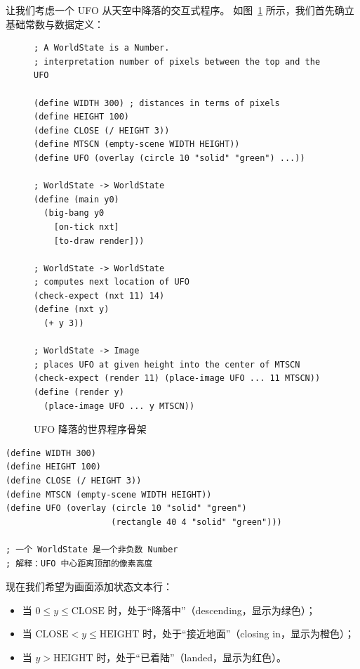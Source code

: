 让我们考虑一个 UFO 从天空中降落的交互式程序。
如图~\ref{fig:ufo_descending} 所示，我们首先确立基础常数与数据定义：

\begin{figure}[htbp]
  \centering
\begin{lstlisting}[language=BSL, basicstyle=\scriptsize\ttfamily]
; A WorldState is a Number.
; interpretation number of pixels between the top and the UFO

(define WIDTH 300) ; distances in terms of pixels
(define HEIGHT 100)
(define CLOSE (/ HEIGHT 3))
(define MTSCN (empty-scene WIDTH HEIGHT))
(define UFO (overlay (circle 10 "solid" "green") ...))

; WorldState -> WorldState
(define (main y0)
  (big-bang y0
    [on-tick nxt]
    [to-draw render]))

; WorldState -> WorldState
; computes next location of UFO
(check-expect (nxt 11) 14)
(define (nxt y)
  (+ y 3))

; WorldState -> Image
; places UFO at given height into the center of MTSCN
(check-expect (render 11) (place-image UFO ... 11 MTSCN))
(define (render y)
  (place-image UFO ... y MTSCN))
\end{lstlisting}
  \caption{UFO 降落的世界程序骨架}
  \label{fig:ufo_descending}
\end{figure}

\begin{lstlisting}[language=BSL]
(define WIDTH 300)
(define HEIGHT 100)
(define CLOSE (/ HEIGHT 3))
(define MTSCN (empty-scene WIDTH HEIGHT))
(define UFO (overlay (circle 10 "solid" "green")
                     (rectangle 40 4 "solid" "green")))

; 一个 WorldState 是一个非负数 Number
; 解释：UFO 中心距离顶部的像素高度
\end{lstlisting}

现在我们希望为画面添加状态文本行：
\begin{itemize}
  \item 当 $0 \le y \le \text{CLOSE}$ 时，处于“降落中”（descending，显示为绿色）；
  \item 当 $\text{CLOSE} < y \le \text{HEIGHT}$ 时，处于“接近地面”（closing in，显示为橙色）；
  \item 当 $y > \text{HEIGHT}$ 时，处于“已着陆”（landed，显示为红色）。
\end{itemize}

